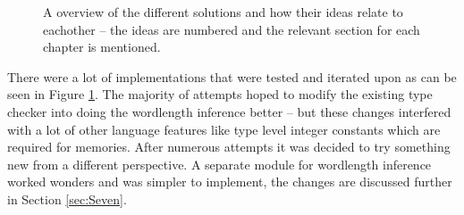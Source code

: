 \begin{figure}[h!]
  \caption{A overview of the different solutions and how their ideas relate to eachother -- the ideas are numbered and the relevant section for each chapter is mentioned.}
  \label{fig:taxonomy}
\end{figure}

There were a lot of implementations that were tested and iterated upon as can be seen in Figure \ref{fig:taxonomy}. The majority of attempts hoped to modify the existing type checker into doing the wordlength inference better -- but these changes interfered with a lot of other language features like type level integer constants which are required for memories. After numerous attempts it was decided to try something new from a different perspective. A separate module for wordlength inference worked wonders and was simpler to implement, the changes are discussed further in Section \ref{sec:Seven}.


